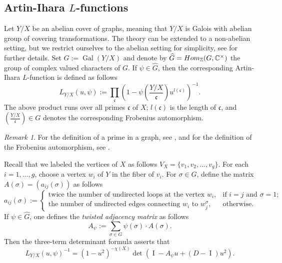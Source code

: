 \documentclass[11pt]{amsart}
\numberwithin{equation}{section}
\theoremstyle{remark}
\newtheorem{remark}[theorem]{Remark}
\newcommand{\op}[1]{\operatorname{#1}}
\begin{document}
\subsection{Artin-Ihara $L$-functions} \label{l_function}
Let $Y/X$ be an abelian cover of graphs, meaning that $Y/X$ is Galois with abelian group of covering transformations. The theory can be extended to a non-abelian setting, but we restrict ourselves to the abelian setting for simplicity, see \cite{Terras:2011} for further details. Set $G := \op{Gal}(Y/X)$ and denote by $\widehat{G} = {\rm Hom}_{\mathbb{Z}}(G,\mathbb{C}^{\times})$ the group of complex valued characters of $G$.  If $\psi \in \widehat{G}$, then the corresponding Artin-Ihara $L$-function is defined as follows
$$L_{Y/X}(u,\psi) := \prod_{\mathfrak{c}}\left(1 - \psi\left(\frac{Y/X}{\mathfrak{c}} \right)u^{l(\mathfrak{c})} \right)^{-1}. $$
The above product runs over all primes $\mathfrak{c}$ of $X$; $l(\mathfrak{c})$ is the length of $\mathfrak{c}$, and $\left(\frac{Y/X}{\mathfrak{c}} \right) \in G$ denotes the corresponding Frobenius automorphism.  
\begin{remark}For the definition of a prime in a graph, see \cite[Section 2.2]{Terras:2011}, and for the definition of the Frobenius automorphism, see \cite[Section 16]{Terras:2011}.
\end{remark}Recall that we labeled the vertices of $X$ as follows $V_{X} = \{v_{1},v_{2},\ldots,v_{g} \}$.  For each $i=1,\ldots,g$, choose a vertex $w_{i}$ of $Y$ in the fiber of $v_{i}$. For $\sigma \in G$, define the matrix $A(\sigma) = (a_{ij}(\sigma))$ as follows
\begin{equation*}
a_{ij}(\sigma) := 
\begin{cases}
\text{twice the number of undirected loops at the vertex } w_{i}, &\text{if } i=j \text{ and } \sigma =1;\\
\text{the number of undirected edges connecting } w_{i} \text{ to } w_{j}^{\sigma}, &\text{otherwise}.
\end{cases}
\end{equation*}
If $\psi \in \widehat{G}$, one defines the \emph{twisted adjacency matrix} as follows
\begin{equation}\label{twisted}
A_{\psi} := \sum_{\sigma \in G}\psi(\sigma) \cdot A(\sigma). 
\end{equation}
Then the three-term determinant formula \cite[Theorem 18.15]{Terras:2011} asserts that
\begin{equation} \label{3terms}
L_{Y/X}(u,\psi)^{-1} = \left(1 - u^{2}\right)^{-\chi(X)}  \op{det}\left(\op{I} - A_{\psi}u + (D-\op{I})u^{2}\right).
\end{equation}
\end{document}
